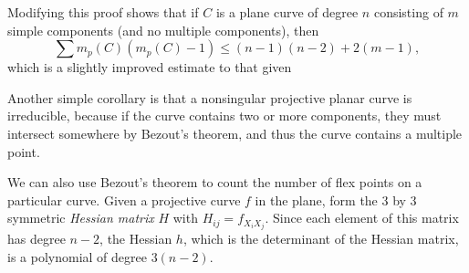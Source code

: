 \begin{remark}
    Modifying this proof shows that if $C$ is a plane curve of degree $n$ consisting of $m$ simple components (and no multiple components), then
    \[ \sum m_p(C) (m_p(C)-1) \leq (n-1)(n-2) + 2(m - 1), \]
    which is a slightly improved estimate to that given 
\end{remark}

Another simple corollary is that a nonsingular projective planar curve is irreducible, because if the curve contains two or more components, they must intersect somewhere by Bezout's theorem, and thus the curve contains a multiple point.

We can also use Bezout's theorem to count the number of flex points on a particular curve. Given a projective curve $f$ in the plane, form the 3 by 3 symmetric \emph{Hessian matrix} $H$ with $H_{ij} = f_{X_i X_j}$. Since each element of this matrix has degree $n-2$, the Hessian $h$, which is the determinant of the Hessian matrix, is a polynomial of degree $3(n-2)$.

